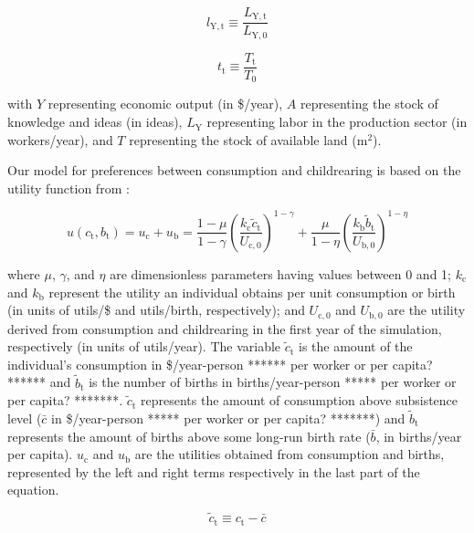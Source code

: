 \documentclass[letterpaper,12pt]{article}
\begin{document}
\begin{equation} \label{eq:index_l}
	l_\mathrm{Y,t} \equiv \frac{L_\mathrm{Y,t}}{L_\mathrm{Y,0}}
\end{equation}

\begin{equation} \label{eq:index_t}
	t_\mathrm{t} \equiv \frac{T_\mathrm{t}}{T_\mathrm{0}}
\end{equation}

\noindent with $Y$ representing economic output (in \$/year), $A$ representing the stock of knowledge and ideas (in ideas), $L_\mathrm{Y}$ representing labor in the production sector (in workers/year), and $T$ representing the stock of available land ($\mathrm{m}^2$).

Our model for preferences between consumption and childrearing is based on the utility function from \citet{Jones:2001wn}:

\begin{equation} \label{eq:utility_function}
	u(c_\mathrm{t}, b_\mathrm{t}) = u_\mathrm{c} + u_\mathrm{b} = \frac{1-\mu}{1-\gamma} \left(\frac{k_\mathrm{c} \tilde c_\mathrm{t}}{U_\mathrm{c,0}} \right)^{1-\gamma} + \frac{\mu}{1-\eta} \left(\frac{k_\mathrm{b} \tilde b_\mathrm{t}}{U_\mathrm{b,0}} \right)^{1-\eta}
\end{equation}

\noindent where $\mu$, $\gamma$, and $\eta$ are dimensionless parameters having values between 0 and 1; $k_\mathrm{c}$ and $k_\mathrm{b}$ represent the utility an individual obtains per unit consumption or birth (in units of utils/\$ and utils/birth, respectively); and $U_{\mathrm{c,0}}$ and $U_{\mathrm{b,0}}$ are the utility derived from consumption and childrearing in the first year of the simulation, respectively (in units of utils/year). The variable $\tilde c_\mathrm{t}$ is the amount of the individual's consumption in \$/year-person ****** per worker or per capita? ****** and $\tilde b_\mathrm{t}$ is the number of births in births/year-person ***** per worker or per capita? *******. $\tilde c_\mathrm{t}$ represents the amount of consumption above subsistence level ($\bar c$ in \$/year-person ***** per worker or per capita? *******) and $\tilde b_\mathrm{t}$ represents the amount of births above some long-run birth rate ($\bar b$, in births/year per capita). $u_\mathrm{c}$ and $u_\mathrm{b}$ are the utilities obtained from consumption and births, represented by the left and right terms respectively in the last part of the equation.

\begin{equation} \label{eq:c_tilde}
	\tilde c_\mathrm{t} \equiv c_\mathrm{t} - \bar c
\end{equation}
\end{document}
